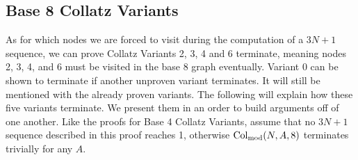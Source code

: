 \subsection{Base 8 Collatz Variants} \label{subsubsec:base8subprob}
As for which nodes we are forced to visit during the computation of a $3N+1$ sequence, we can prove Collatz Variants 2, 3, 4 and 6 terminate, meaning nodes 2, 3, 4, and 6 must be visited in the base 8 graph eventually. Variant 0 can be shown to terminate if another unproven variant terminates. It will still be mentioned with the already proven variants. The following will explain how these five variants terminate. We present them in an order to build arguments off of one another. Like the proofs for Base 4 Collatz Variants, assume that no $3N+1$ sequence described in this proof reaches 1, otherwise $\mathrm{Col}_{\text{mod}}(N,A,8)$ terminates trivially for any $A$.
